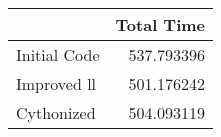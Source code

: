 \begin{tabular}{lr}
\toprule
{} &  Total Time \\
\midrule
Initial Code &  537.793396 \\
Improved ll  &  501.176242 \\
Cythonized   &  504.093119 \\
\bottomrule
\end{tabular}
